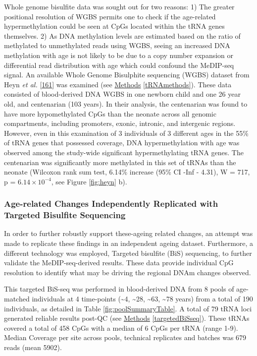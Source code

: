 \documentclass[
]{book}
\begin{document}
Whole genome bisulfite data was sought out for two reasons:
1) The greater positional resolution of WGBS permits one to check if the age-related hypermethylation could be seen at CpGs located within the tRNA genes themselves.
2) As DNA methylation levels are estimated based on the ratio of methylated to unmethylated reads using WGBS, seeing an increased DNA methylation with age is not likely to be due to a copy number expansion or differential read distribution with age which could confound the MeDIP-seq signal.
An available Whole Genome Bisulphite sequencing (WGBS) dataset from Heyn \emph{et al.} {[}\protect\hyperlink{ref-Heyn2012}{161}{]} was examined (see \protect\hyperlink{tRNAmethods}{Methods} \ref{tRNAmethods}).
These data consisted of blood-derived DNA WGBS in one newborn child and one 26 year old, and centenarian (103 years).
In their analysis, the centenarian was found to have more hypomethylated CpGs than the neonate across all genomic compartments, including promoters, exonic, intronic, and intergenic regions.
However, even in this examination of 3 individuals of 3 different ages in the 55\% of tRNA genes that possessed coverage, DNA hypermethylation with age was observed among the study-wide significant hypermethylating tRNA genes.
The centenarian was significantly more methylated in this set of tRNAs than the neonate (Wilcoxon rank sum test, 6.14\% increase (95\% CI -Inf - 4.31), W = 717, p = \(6.14\times10^{-4}\), see Figure \ref{fig:heyn} b).

\newpage

\hypertarget{age-related-changes-independently-replicated-with-targeted-bisulfite-sequencing}{%
\subsubsection{Age-related Changes Independently Replicated with Targeted Bisulfite Sequencing}\label{age-related-changes-independently-replicated-with-targeted-bisulfite-sequencing}}

In order to further robustly support these-ageing related changes, an attempt was made to replicate these findings in an independent ageing dataset.
Furthermore, a different technology was employed, Targeted bisulfite (BiS) sequencing, to further validate the MeDIP-seq-derived results.
These data provide individual CpG resolution to identify what may be driving the regional DNAm changes observed.

This targeted BiS-seq was performed in blood-derived DNA from 8 pools of age-matched individuals at 4 time-points (\textasciitilde4, \textasciitilde28, \textasciitilde63, \textasciitilde78 years) from a total of 190 individuals, as detailed in Table \ref{fig:poolSummaryTable}.
A total of 79 tRNA loci generated reliable results post-QC (see \protect\hyperlink{targetedBiSseq}{Methods} \ref{targetedBiSseq}).
These tRNAs covered a total of 458 CpGs with a median of 6 CpGs per tRNA (range 1-9).
Median Coverage per site across pools, technical replicates and batches was 679 reads (mean 5902).
\end{document}
